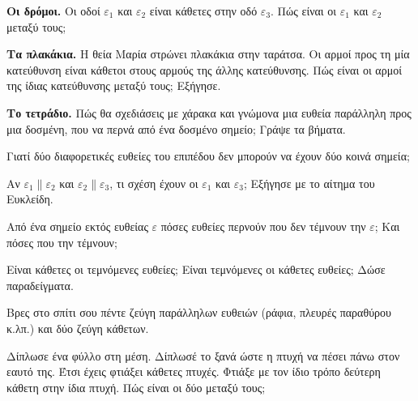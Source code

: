 \ex \textbf{Οι δρόμοι.} Οι οδοί $\varepsilon_1$ και $\varepsilon_2$ είναι κάθετες στην οδό $\varepsilon_3$. Πώς είναι οι $\varepsilon_1$ και $\varepsilon_2$ μεταξύ τους;

\ex \textbf{Τα πλακάκια.} Η θεία Μαρία στρώνει πλακάκια στην ταράτσα. Οι αρμοί προς τη μία κατεύθυνση είναι κάθετοι στους αρμούς της άλλης κατεύθυνσης. Πώς είναι οι αρμοί της ίδιας κατεύθυνσης μεταξύ τους; Εξήγησε.

\ex \textbf{Το τετράδιο.} Πώς θα σχεδιάσεις με χάρακα και γνώμονα μια ευθεία παράλληλη προς μια δοσμένη, που να περνά από ένα δοσμένο σημείο; Γράψε τα βήματα.


\ex Γιατί δύο διαφορετικές ευθείες του επιπέδου δεν μπορούν να έχουν δύο κοινά σημεία;

\ex Αν $\varepsilon_1\parallel\varepsilon_2$ και $\varepsilon_2\parallel\varepsilon_3$, τι σχέση έχουν οι $\varepsilon_1$ και $\varepsilon_3$; Εξήγησε με το αίτημα του Ευκλείδη.

\ex Από ένα σημείο εκτός ευθείας $\varepsilon$ πόσες ευθείες περνούν που δεν τέμνουν την $\varepsilon$; Και πόσες που την τέμνουν;

\ex Είναι κάθετες οι τεμνόμενες ευθείες; Είναι τεμνόμενες οι κάθετες ευθείες; Δώσε παραδείγματα.


\ex Βρες στο σπίτι σου πέντε ζεύγη παράλληλων ευθειών (ράφια, πλευρές παραθύρου κ.λπ.) και δύο ζεύγη κάθετων.

\ex Δίπλωσε ένα φύλλο στη μέση. Δίπλωσέ το ξανά ώστε η πτυχή να πέσει πάνω στον εαυτό της. Έτσι έχεις φτιάξει κάθετες πτυχές. Φτιάξε με τον ίδιο τρόπο δεύτερη κάθετη στην ίδια πτυχή. Πώς είναι οι δύο μεταξύ τους;
